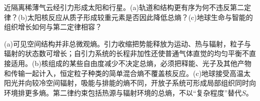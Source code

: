 \begin{exercise}[原题8(a)--(c)，选做]\label{p:333-1-8}
近隔离稀薄气云经引力形成太阳和行星。(a)轨道和结构更有序为何不违反第二定律？(b)太阳核反应从质子形成较重元素是否因此降低总熵？(c)地球生命与智能的组织增长如何与第二定律相容？
\end{exercise}
\begin{solution}
(a)可见空间结构并非总微观熵。引力收缩把势能释放为运动、热与辐射，粒子与辐射的状态数可增长；自引力系统的长程非加性还使普通气体直觉的均匀平衡不直接适用。(b)核组成的某些自由度减少不决定总熵，必须把释能、光子及其他产物和传输一起计入，恒定粒子种类的简单混合熵不覆盖核反应。(c)地球接受高温太阳光并向较冷空间辐射，吸能与排能的熵不同，开放子系统可形成局部组织同时向环境排更多熵。第二律约束包括热源与辐射环境的总熵，不以“复杂程度”替代$S$。
\end{solution}
